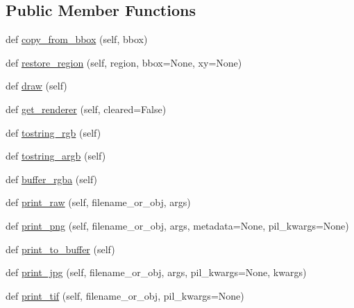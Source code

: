 \subsection*{Public Member Functions}
\begin{DoxyCompactItemize}
\item 
def \hyperlink{classmatplotlib_1_1backends_1_1backend__agg_1_1FigureCanvasAgg_a8086a6d613294e727e96e7e9c16ea825}{copy\+\_\+from\+\_\+bbox} (self, bbox)
\item 
def \hyperlink{classmatplotlib_1_1backends_1_1backend__agg_1_1FigureCanvasAgg_a93aff0e878330b899fed6ae93fdbf8eb}{restore\+\_\+region} (self, region, bbox=None, xy=None)
\item 
def \hyperlink{classmatplotlib_1_1backends_1_1backend__agg_1_1FigureCanvasAgg_ae2ff6433d4c1d93723ff2632fc227355}{draw} (self)
\item 
def \hyperlink{classmatplotlib_1_1backends_1_1backend__agg_1_1FigureCanvasAgg_a2e799e641b3194b7da555bfd008c4b6f}{get\+\_\+renderer} (self, cleared=False)
\item 
def \hyperlink{classmatplotlib_1_1backends_1_1backend__agg_1_1FigureCanvasAgg_abda37d01f620e31d0d796d3ebdef687f}{tostring\+\_\+rgb} (self)
\item 
def \hyperlink{classmatplotlib_1_1backends_1_1backend__agg_1_1FigureCanvasAgg_afa211b6c9b80279f8ac3ffccb38a9491}{tostring\+\_\+argb} (self)
\item 
def \hyperlink{classmatplotlib_1_1backends_1_1backend__agg_1_1FigureCanvasAgg_adac1dbd2691b2feb8f757fcb448168fd}{buffer\+\_\+rgba} (self)
\item 
def \hyperlink{classmatplotlib_1_1backends_1_1backend__agg_1_1FigureCanvasAgg_aee1e2db948fa61185852f863465843c8}{print\+\_\+raw} (self, filename\+\_\+or\+\_\+obj, args)
\item 
def \hyperlink{classmatplotlib_1_1backends_1_1backend__agg_1_1FigureCanvasAgg_a15df5f5140d19f202f7e5ca464438b50}{print\+\_\+png} (self, filename\+\_\+or\+\_\+obj, args, metadata=None, pil\+\_\+kwargs=None)
\item 
def \hyperlink{classmatplotlib_1_1backends_1_1backend__agg_1_1FigureCanvasAgg_a484e39014e82c584d595479032f0c0cb}{print\+\_\+to\+\_\+buffer} (self)
\item 
def \hyperlink{classmatplotlib_1_1backends_1_1backend__agg_1_1FigureCanvasAgg_a2751e214e7473bce0c1e8324e057adb5}{print\+\_\+jpg} (self, filename\+\_\+or\+\_\+obj, args, pil\+\_\+kwargs=None, kwargs)
\item 
def \hyperlink{classmatplotlib_1_1backends_1_1backend__agg_1_1FigureCanvasAgg_a71b633e45152cc6f3bfc96f2a248a331}{print\+\_\+tif} (self, filename\+\_\+or\+\_\+obj, pil\+\_\+kwargs=None)
\end{DoxyCompactItemize}
